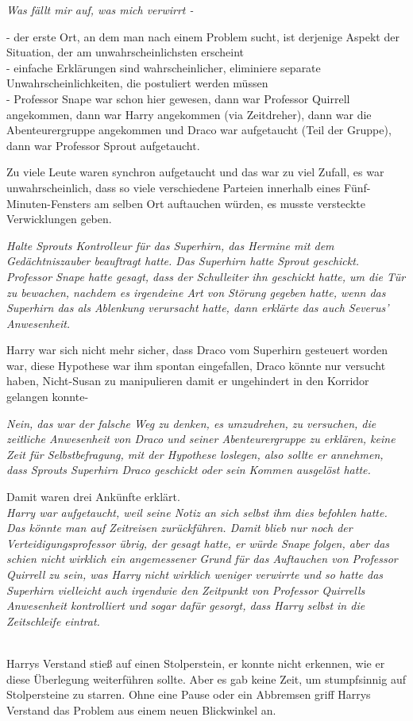 {\emph{Was fällt mir auf, was mich verwirrt -}

- der erste Ort, an dem man nach einem Problem sucht, ist derjenige Aspekt der Situation, der am unwahrscheinlichsten erscheint\\ - einfache Erklärungen sind wahrscheinlicher, eliminiere separate Unwahrscheinlichkeiten, die postuliert werden müssen\\ - Professor Snape war schon hier gewesen, dann war Professor Quirrell angekommen, dann war Harry angekommen (via Zeitdreher), dann war die Abenteurergruppe angekommen und Draco war aufgetaucht (Teil der Gruppe), dann war Professor Sprout aufgetaucht.

Zu viele Leute waren synchron aufgetaucht und das war zu viel Zufall, es war unwahrscheinlich, dass so viele verschiedene Parteien innerhalb eines Fünf-Minuten-Fensters am selben Ort auftauchen würden, es musste versteckte Verwicklungen geben.

\emph{Halte Sprouts Kontrolleur für das Superhirn, das Hermine mit dem Gedächtniszauber beauftragt hatte. Das Superhirn hatte Sprout geschickt.\\ Professor Snape hatte gesagt, dass der Schulleiter ihn geschickt hatte, um die Tür zu bewachen, nachdem es irgendeine Art von Störung gegeben hatte, wenn das Superhirn das als Ablenkung verursacht hatte, dann erklärte das auch Severus' Anwesenheit.}

Harry war sich nicht mehr sicher, dass Draco vom Superhirn gesteuert worden war, diese Hypothese war ihm spontan eingefallen, Draco könnte nur versucht haben, Nicht-Susan zu manipulieren damit er ungehindert in den Korridor gelangen konnte-

\emph{Nein, das war der falsche Weg zu denken, es umzudrehen, zu versuchen, die zeitliche Anwesenheit von Draco und seiner Abenteurergruppe zu erklären, keine Zeit für Selbstbefragung, mit der Hypothese loslegen, also sollte er annehmen, dass Sprouts Superhirn Draco geschickt oder sein Kommen ausgelöst hatte.}

Damit waren drei Ankünfte erklärt.\\ \emph{\hfill\break Harry war aufgetaucht, weil seine Notiz an sich selbst ihm dies befohlen hatte.\\ Das könnte man auf Zeitreisen zurückführen. Damit blieb nur noch der Verteidigungsprofessor übrig, der gesagt hatte, er würde Snape folgen, aber das schien nicht wirklich ein angemessener Grund für das Auftauchen von Professor Quirrell zu sein, was Harry nicht wirklich weniger verwirrte und so hatte das Superhirn vielleicht auch irgendwie den Zeitpunkt von Professor Quirrells Anwesenheit kontrolliert und sogar dafür gesorgt, dass Harry selbst in die} \emph{Zeitschleife eintrat.\\ }\strut \\ Harrys Verstand stieß auf einen Stolperstein, er konnte nicht erkennen, wie er diese Überlegung weiterführen sollte. Aber es gab keine Zeit, um stumpfsinnig auf Stolpersteine zu starren. Ohne eine Pause oder ein Abbremsen griff Harrys Verstand das Problem aus einem neuen Blickwinkel an.

}

